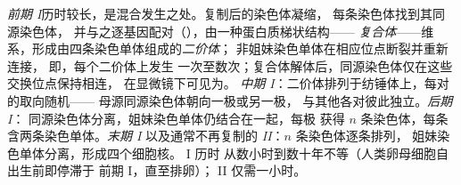 \begin{proposition}[各阶段]\label{prop:b2:meiosis-heredity:stages}
\emph{前期 I}历时较长，是混合发生之处。复制后的染色体凝缩，
每条染色体找到其同源染色体，
并与之逐基因配对（\emph{}），由一种蛋白质梯状结构——
\emph{复合体}——维系，形成由四条染色单体组成的\emph{二价体}；
非姐妹染色单体在相应位点断裂并重新连接，
即\emph{}，每个二价体上发生
一次至数次；复合体解体后，同源染色体仅在这些交换位点保持相连，
在显微镜下可见为\emph{}。
\emph{中期 I}：二价体排列于纺锤体上，每对的取向随机——
母源同源染色体朝向一极或另一极，
与其他各对彼此独立。\emph{后期 I}：
同源染色体分离，姐妹染色单体仍结合在一起，每极
获得 $n$ 条染色体，每条含两条染色单体。\emph{末期 I}
以及通常不再复制的\emph{ II}：$n$ 条染色体逐条排列，
姐妹染色单体分离，形成四个细胞核。 I 历时
从数小时到数十年不等（人类卵母细胞自出生前即停滞于
前期 I，直至排卵）；
 II 仅需一小时。
\end{proposition}

